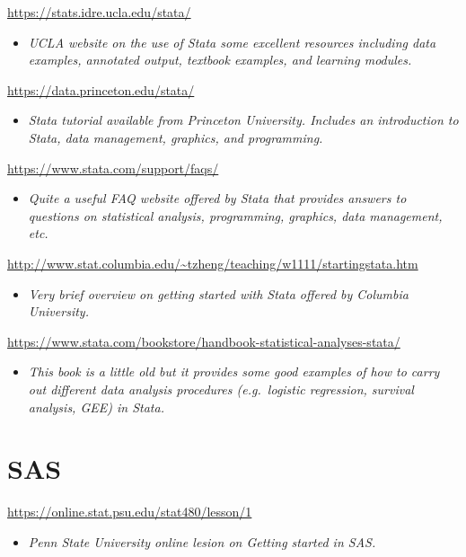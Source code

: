 \documentclass[
]{book}
\providecommand{\tightlist}{%
  \setlength{\itemsep}{0pt}\setlength{\parskip}{0pt}}
\begin{document}
\url{https://stats.idre.ucla.edu/stata/}

\begin{itemize}
\tightlist
\item
  \emph{UCLA website on the use of Stata some excellent resources including data examples, annotated output, textbook examples, and learning modules.}
\end{itemize}

\url{https://data.princeton.edu/stata/}

\begin{itemize}
\tightlist
\item
  \emph{Stata tutorial available from Princeton University. Includes an introduction to Stata, data management, graphics, and programming.}
\end{itemize}

\url{https://www.stata.com/support/faqs/}

\begin{itemize}
\tightlist
\item
  \emph{Quite a useful FAQ website offered by Stata that provides answers to questions on statistical analysis, programming, graphics, data management, etc.}
\end{itemize}

\url{http://www.stat.columbia.edu/~tzheng/teaching/w1111/startingstata.htm}

\begin{itemize}
\tightlist
\item
  \emph{Very brief overview on getting started with Stata offered by Columbia University.}
\end{itemize}

\url{https://www.stata.com/bookstore/handbook-statistical-analyses-stata/}

\begin{itemize}
\tightlist
\item
  \emph{This book is a little old but it provides some good examples of how to carry out different data analysis procedures (e.g.~logistic regression, survival analysis, GEE) in Stata.}
\end{itemize}

\section{SAS}\label{sas}

\url{https://online.stat.psu.edu/stat480/lesson/1}

\begin{itemize}
\tightlist
\item
  \emph{Penn State University online lesion on Getting started in SAS.}
\end{itemize}
\end{document}
